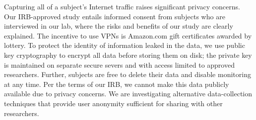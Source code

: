 Capturing all of a subject's Internet traffic raises significant
privacy concerns.  Our IRB-approved study entails informed consent
from subjects who are interviewed in our lab, where the risks and
benefits of our study are clearly explained.  The incentive to use
VPNs is Amazon.com gift certificates awarded by lottery. To protect the
identity of information leaked in the data, we use public key
cryptography to encrypt all data before storing them 
on disk; the private key is
maintained on separate secure severs and with access limited to
approved researchers.  Further, subjects are free to delete their
data and disable monitoring at any time.  Per the terms of our IRB, we cannot 
make this data publicly available due to privacy concerns. We are investigating 
alternative data-collection techniques that provide user anonymity sufficient 
for sharing with other researchers.



